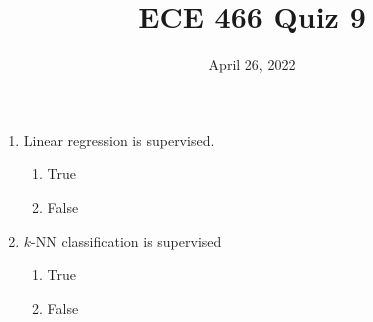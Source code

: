 \documentclass{article}
\date{April 26, 2022}
\begin{document}
 
\title{ECE 466 Quiz 9}
 
\maketitle
 
\begin{enumerate}

    \item Linear regression is supervised.
    \begin{enumerate}
        \item True
        \item False
    \end{enumerate}
    
    \item $k$-NN classification is supervised
    \begin{enumerate}
        \item True
        \item False
    \end{enumerate}

\end{enumerate}
\end{document}
